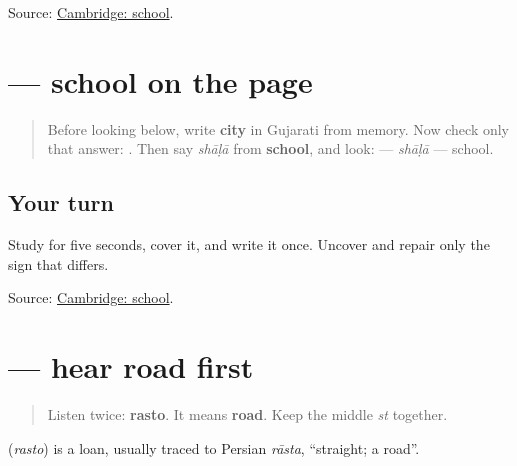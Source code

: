 \begin{tcolorbox}[breakable,colback=teal!4,colframe=teal!35!black,title={Before you move on}]
Source: \href{https://dictionary.cambridge.org/dictionary/english-gujarati/school}{Cambridge: school}.
\end{tcolorbox}
\section[\texorpdfstring{\gu{શાળા} (shāḷā)}{શાળા (shāḷā)}]{ — school on the page}

\label{lesson:GU-C22-shaalaa}



\begin{quote}
Before looking below, write \textbf{city} in Gujarati from memory. Now check only that answer: \textbf{}. Then say \emph{shāḷā} from \textbf{school}, and look: \textbf{} — \emph{shāḷā} — school.
\end{quote}

\subsection*{Your turn}

Study \textbf{} for five seconds, cover it, and write it once. Uncover and repair only the sign that differs.

\begin{tcolorbox}[breakable,colback=teal!4,colframe=teal!35!black,title={Before you move on}]
Source: \href{https://dictionary.cambridge.org/dictionary/english-gujarati/school}{Cambridge: school}.
\end{tcolorbox}
\section[\texorpdfstring{\gu{રસ્તો} (rasto)}{રસ્તો (rasto)}]{ — hear road first}

\label{lesson:GU-C22-hear-rasto}



\begin{quote}
Listen twice: \textbf{rasto}. It means \textbf{road}. Keep the middle \emph{st} together.
\end{quote}

\begin{cousinweb}
\textbf{} (\emph{rasto}) is a loan, usually traced to Persian \emph{rāsta}, \textquotedblleft{}straight; a road\textquotedblright{}.
\end{cousinweb}

